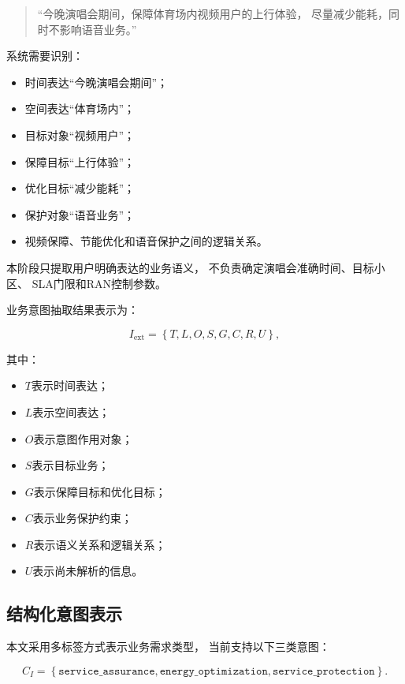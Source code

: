 \documentclass[lang=cn,12pt]{elegantbook}
\begin{document}
\begin{quote}
“今晚演唱会期间，保障体育场内视频用户的上行体验，
尽量减少能耗，同时不影响语音业务。”
\end{quote}

系统需要识别：

\begin{itemize}
    \item 时间表达“今晚演唱会期间”；
    \item 空间表达“体育场内”；
    \item 目标对象“视频用户”；
    \item 保障目标“上行体验”；
    \item 优化目标“减少能耗”；
    \item 保护对象“语音业务”；
    \item 视频保障、节能优化和语音保护之间的逻辑关系。
\end{itemize}

本阶段只提取用户明确表达的业务语义，
不负责确定演唱会准确时间、目标小区、
SLA门限和RAN控制参数。

业务意图抽取结果表示为：

\begin{equation}
I_{\mathrm{ext}}
=
\left\{
T,L,O,S,G,C,R,U
\right\},
\label{eq:structured_intent_representation}
\end{equation}

其中：

\begin{itemize}
    \item $T$表示时间表达；
    \item $L$表示空间表达；
    \item $O$表示意图作用对象；
    \item $S$表示目标业务；
    \item $G$表示保障目标和优化目标；
    \item $C$表示业务保护约束；
    \item $R$表示语义关系和逻辑关系；
    \item $U$表示尚未解析的信息。
\end{itemize}


\subsection*{结构化意图表示}

本文采用多标签方式表示业务需求类型，
当前支持以下三类意图：

\begin{equation}
C_I
=
\left\{
\texttt{service\_assurance},
\texttt{energy\_optimization},
\texttt{service\_protection}
\right\}.
\label{eq:intent_type_set}
\end{equation}
\end{document}
